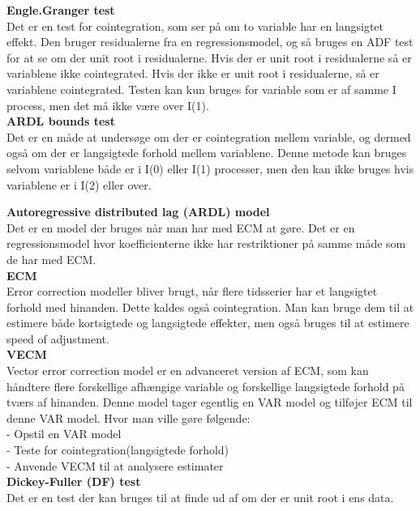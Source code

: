 \documentclass[
  10pt,
]{article}
\begin{document}
\textbf{Engle.Granger test}\\
Det er en test for cointegration, som ser på om to variable har en
langsigtet effekt. Den bruger residualerne fra en regressionsmodel, og
så bruges en ADF test for at se om der unit root i residualerne. Hvis
der er unit root i residualerne så er variablene ikke cointegrated. Hvis
der ikke er unit root i residualerne, så er variablene cointegrated.
Testen kan kun bruges for variable som er af samme I process, men det må
ikke være over I(1).\\

\textbf{ARDL bounds test}\\
Det er en måde at undersøge om der er cointegration mellem variable, og
dermed også om der er langsigtede forhold mellem variablene. Denne
metode kan bruges selvom variablene både er i I(0) eller I(1) processer,
men den kan ikke bruges hvis variablene er i I(2) eller over.

\newpage

\textbf{Autoregressive distributed lag (ARDL) model}\\
Det er en model der bruges når man har med ECM at gøre. Det er en
regressionsmodel hvor koefficienterne ikke har restriktioner på samme
måde som de har med ECM.\\

\textbf{ECM}\\
Error correction modeller bliver brugt, når flere tidsserier har et
langsigtet forhold med hinanden. Dette kaldes også cointegration. Man
kan bruge dem til at estimere både kortsigtede og langsigtede effekter,
men også bruges til at estimere speed of adjustment.\\

\textbf{VECM}\\
Vector error correction model er en advanceret version af ECM, som kan
håndtere flere forskellige afhængige variable og forskellige langsigtede
forhold på tværs af hinanden. Denne model tager egentlig en VAR model og
tilføjer ECM til denne VAR model. Hvor man ville gøre følgende:\\
- Opstil en VAR model\\
- Teste for cointegration(langsigtede forhold)\\
- Anvende VECM til at analysere estimater\\

\textbf{Dickey-Fuller (DF) test }\\
Det er en test der kan bruges til at finde ud af om der er unit root i
ens data.\\
\end{document}
